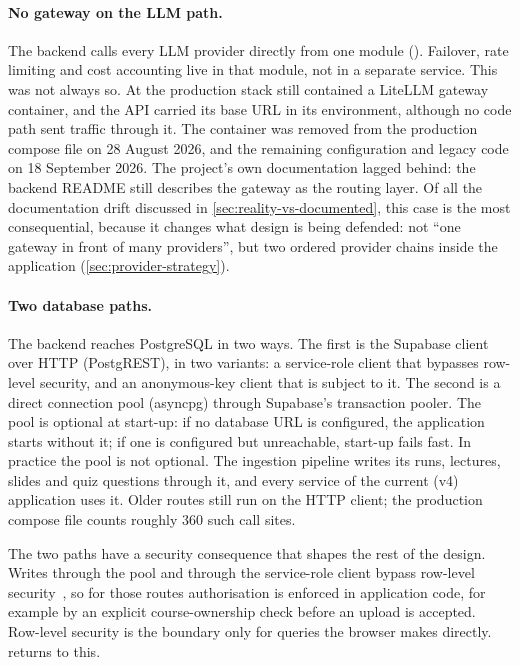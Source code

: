 \paragraph{No gateway on the LLM path.}
The backend calls every LLM provider directly from one module
(). Failover, rate limiting and cost
accounting live in that module, not in a separate service. This was not always
so. At \code{\thesisEarlierCommit} the production stack still contained a LiteLLM gateway
container, and the API carried its base URL in its environment, although no code
path sent traffic through it. The container was removed from the production
compose file on 28 August 2026, and the remaining configuration and legacy code
on 18 September 2026. The project's own documentation lagged behind: the backend
README still describes the gateway as the routing layer. Of all the
documentation drift discussed in \cref{sec:reality-vs-documented}, this case is
the most consequential, because it changes what design is being defended: not
``one gateway in front of many providers'', but two ordered provider chains
inside the application (\cref{sec:provider-strategy}).

\paragraph{Two database paths.}
The backend reaches PostgreSQL in two ways. The first is the Supabase client
over HTTP (PostgREST), in two variants: a service-role client that bypasses
row-level security, and an anonymous-key client that is subject to it. The
second is a direct connection pool (asyncpg) through Supabase's transaction
pooler. The pool is optional at start-up: if no database URL is configured, the
application starts without it; if one is configured but unreachable, start-up
fails fast. In practice the pool is not optional. The ingestion pipeline writes
its runs, lectures, slides and quiz questions through it, and every service of
the current (v4) application uses it. Older routes still run on the HTTP client;
the production compose file counts roughly 360 such call sites.

The two paths have a security consequence that shapes the rest of the design.
Writes through the pool and through the service-role client bypass row-level
security~\cite{postgresql-rls}, so for those routes authorisation is enforced in
application code, for example by an explicit course-ownership check before an
upload is accepted. Row-level security is the boundary only for queries the
browser makes directly.  returns to this.

